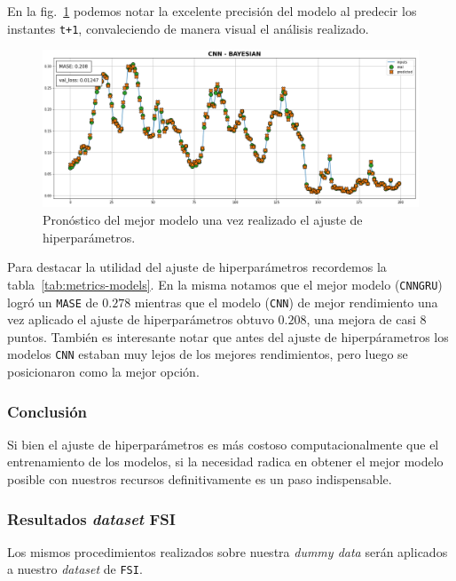\documentclass[a4paper,12pt]{article}
\begin{document}
En la fig.~\ref{fig:best_model_hp} podemos notar la excelente precisión del modelo al predecir los instantes \texttt{t+1}, convaleciendo de manera visual el análisis realizado.

\begin{figure}[H]
	\begin{center}
	\includegraphics[width=1\textwidth]{cnn_bo_best.png}
  	\caption{Pronóstico del mejor modelo una vez realizado el ajuste de hiperparámetros.}
  	\label{fig:best_model_hp}
  	\end{center}
\end{figure}

Para destacar la utilidad del ajuste de hiperparámetros recordemos la tabla~\ref{tab:metrics-models}. En la misma notamos que el mejor modelo (\texttt{CNNGRU}) logró un \texttt{MASE} de $0.278$ mientras que el modelo (\texttt{CNN}) de mejor rendimiento una vez aplicado el ajuste de hiperparámetros obtuvo $0.208$, una mejora de casi 8 puntos. También es interesante notar que antes del ajuste de hiperpárametros los modelos \texttt{CNN} estaban muy lejos de los mejores rendimientos, pero luego se posicionaron como la mejor opción.

\subsubsection{Conclusión}
Si bien el ajuste de hiperparámetros es más costoso computacionalmente que el entrenamiento de los modelos, si la necesidad radica en obtener el mejor modelo posible con nuestros recursos definitivamente es un paso indispensable.

\subsubsection{Resultados \textit{dataset} FSI}
Los mismos procedimientos realizados sobre nuestra \textit{dummy data} serán aplicados a nuestro \textit{dataset} de \texttt{FSI}.
\end{document}
